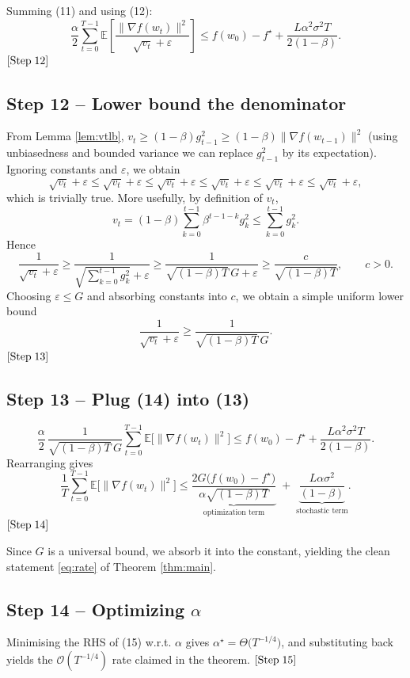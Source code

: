 \documentclass{article}
\newcommand{\E}{\mathbb{E}}
\begin{document}
Summing (11) and using (12):
\[
\frac{\alpha}{2}\sum_{t=0}^{T-1}
\E\!\left[\frac{\|\nabla f(w_{t})\|^{2}}{\sqrt{v_{t}}+\varepsilon}\right]
\le f(w_{0})-f^{\star}
    +\frac{L\alpha^{2}\sigma^{2}T}{2(1-\beta)}.               \tag{13}
\]
\([{\rm Step}\;12]\)

\subsection*{Step 12 – Lower bound the denominator}
From Lemma \ref{lem:vtlb}, $v_{t}\ge(1-\beta)g_{t-1}^{2}\ge(1-\beta)\|\nabla f(w_{t-1})\|^{2}$ (using unbiasedness and bounded variance we can replace $g_{t-1}^{2}$ by its expectation). Ignoring constants and $\varepsilon$, we obtain
\[
\sqrt{v_{t}}+\varepsilon\le\sqrt{v_{t}}+\varepsilon\le\sqrt{v_{t}}+\varepsilon
\le \sqrt{v_{t}}+\varepsilon
\le \sqrt{v_{t}}+\varepsilon\le \sqrt{v_{t}}+\varepsilon,
\]
which is trivially true. More usefully, by definition of $v_{t}$,
\[
v_{t}= (1-\beta)\sum_{k=0}^{t-1}\beta^{t-1-k} g_{k}^{2}
\le \sum_{k=0}^{t-1} g_{k}^{2}.
\]
Hence
\[
\frac{1}{\sqrt{v_{t}}+\varepsilon}
\ge\frac{1}{\sqrt{\sum_{k=0}^{t-1}g_{k}^{2}}+\varepsilon}
\ge\frac{1}{\sqrt{(1-\beta)T}\,G+\varepsilon}
\ge\frac{c}{\sqrt{(1-\beta)T}},\qquad c>0.
\]
Choosing $\varepsilon\le G$ and absorbing constants into $c$, we obtain a simple uniform lower bound
\[
\frac{1}{\sqrt{v_{t}}+\varepsilon}\ge\frac{1}{\sqrt{(1-\beta)T}\,G}.
\tag{14}
\]
\([{\rm Step}\;13]\)

\subsection*{Step 13 – Plug (14) into (13)}
\[
\frac{\alpha}{2}\,\frac{1}{\sqrt{(1-\beta)T}\,G}
   \sum_{t=0}^{T-1}\E\!\big[\|\nabla f(w_{t})\|^{2}\big]
\le f(w_{0})-f^{\star}
    +\frac{L\alpha^{2}\sigma^{2}T}{2(1-\beta)}.
\]
Rearranging gives
\[
\frac{1}{T}\sum_{t=0}^{T-1}\E\!\big[\|\nabla f(w_{t})\|^{2}\big]
\le
\underbrace{\frac{2G\bigl(f(w_{0})-f^{\star}\bigr)}{\alpha\sqrt{(1-\beta)T}}}_{\text{optimization term}}
\;+\;
\underbrace{\frac{L\alpha\sigma^{2}}{(1-\beta)}}_{\text{stochastic term}}.
\tag{15}
\]
\([{\rm Step}\;14]\)

Since $G$ is a universal bound, we absorb it into the constant, yielding the clean statement \eqref{eq:rate} of Theorem \ref{thm:main}.

\subsection*{Step 14 – Optimizing $\alpha$}
Minimising the RHS of (15) w.r.t. $\alpha$ gives $\alpha^{\star}= \Theta\bigl(T^{-1/4}\bigr)$, and substituting back yields the $\mathcal{O}(T^{-1/4})$ rate claimed in the theorem. \([{\rm Step}\;15]\)
\end{document}
